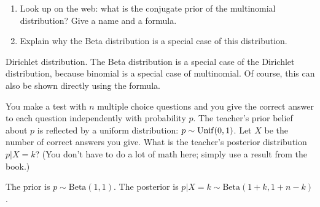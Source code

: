 \begin{exercise} \phantom{ }
\begin{enumerate}
\item Look up on the web: what is the conjugate prior of the multinomial distribution? Give a name and a formula.
\item Explain why the Beta distribution is a special case of this distribution.
\end{enumerate}
\begin{solution}
Dirichlet distribution. The Beta distribution is a special case of the Dirichlet distribution, because binomial is a special case of multinomial. Of course, this can also be shown directly using the formula.
\end{solution}
\end{exercise}



\begin{exercise}
You make a test with $n$ multiple choice questions and you give the correct answer to each question independently with probability $p$. The teacher's prior belief about $p$ is reflected by a uniform distribution: $p \sim \mathrm{Unif}(0,1)$.
Let $X$ be the number of correct answers you give.
What is the teacher's posterior distribution $p|X=k$? (You don't have to do a lot of math here; simply use a result from the book.)
\begin{solution}
The prior is $p \sim \text{Beta}(1,1)$. The posterior is $p|X=k \sim \text{Beta}(1+k,1+n-k)$.
\end{solution}
\end{exercise}


